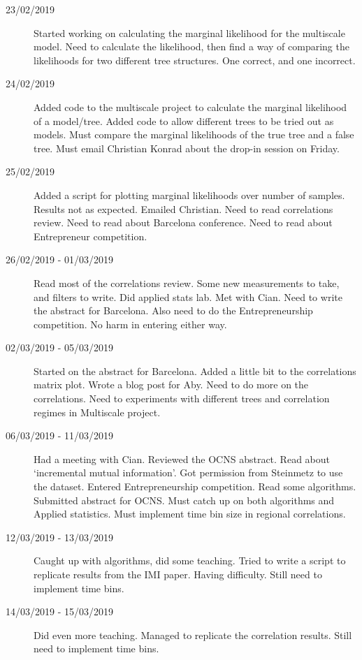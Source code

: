 \documentclass[a4paper,12pt]{article}
\theoremstyle{definition}
\begin{document}
\begin{description}
	\item[23/02/2019] Started working on calculating the marginal likelihood for the multiscale model. Need to calculate the likelihood, then find a way of comparing the likelihoods for two different tree structures. One correct, and one incorrect.

	\item[24/02/2019] Added code to the multiscale project to calculate the marginal likelihood of a model/tree. Added code to allow different trees to be tried out as models. Must compare the marginal likelihoods of the true tree and a false tree. Must email Christian Konrad about the drop-in session on Friday.

	\item[25/02/2019] Added a script for plotting marginal likelihoods over number of samples. Results not as expected. Emailed Christian. Need to read correlations review. Need to read about Barcelona conference. Need to read about Entrepreneur competition.

	\item[26/02/2019 - 01/03/2019] Read most of the correlations review. Some new measurements to take, and filters to write. Did applied stats lab. Met with Cian. Need to write the abstract for Barcelona. Also need to do the Entrepreneurship competition. No harm in entering either way.

	\item[02/03/2019 - 05/03/2019] Started on the abstract for Barcelona. Added a little bit to the correlations matrix plot. Wrote a blog post for Aby. Need to do more on the correlations. Need to experiments with different trees and correlation regimes in Multiscale project.

	\item[06/03/2019 - 11/03/2019] Had a meeting with Cian. Reviewed the OCNS abstract. Read about `incremental mutual information'. Got permission from Steinmetz to use the dataset. Entered Entrepreneurship competition. Read some algorithms. Submitted abstract for OCNS. Must catch up on both algorithms and Applied statistics. Must implement time bin size in regional correlations.

	\item[12/03/2019 - 13/03/2019] Caught up with algorithms, did some teaching. Tried to write a script to replicate results from the IMI paper. Having difficulty. Still need to implement time bins.

	\item[14/03/2019 - 15/03/2019] Did even more teaching. Managed to replicate the correlation results. Still need to implement time bins.


\end{description}
\end{document}
